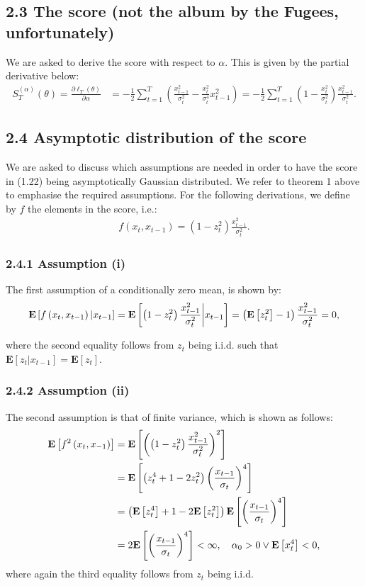 \documentclass[11pt,a4paper,oneside]{article}
\newcommand{\lp}{\left(}
\newcommand{\rp}{\right)}
\newcommand{\rb}{\right]}
\newcommand{\lb}{\left[}
\newcommand{\ee}{\mathbf{E}}
\newcommand{\sumt}{\sum_{t=1}^T}
\begin{document}
\subsection{2.3 The score (not the album by the Fugees, unfortunately)}
We are asked to derive the score with respect to $\alpha$. This is given by the partial derivative below:
\begin{align}
    S_T^{\lp \alpha\rp}\lp \theta\rp = \frac{\partial \ell_T\lp \theta\rp}{\partial \alpha} 
        &= - \frac{1}{2}\sumt \lp \frac{x_{t-1}^2}{\sigma_t^2} - \frac{x_t^2}{\sigma_t^4}x_{t-1}^2\rp = - \frac{1}{2}\sumt \lp 1 - \frac{x_t^2}{\sigma_t^2}\rp \frac{x_{t-1}^2}{\sigma_t^2}.
\end{align}

\subsection{2.4 Asymptotic distribution of the score}
We are asked to discuss which assumptions are needed in order to have the score in (1.22) being asymptotically Gaussian distributed. We refer to theorem 1 above to emphasise the required assumptions. For the following derivations, we define by $f$ the elements in the score, i.e.:
\begin{align}
    f\lp x_t, x_{t-1}\rp = \lp 1 - z_t^2\rp \frac{x_{t-1}^2}{\sigma_t^2}.
\end{align}

\subsubsection{2.4.1 Assumption (i)}
The first assumption of a conditionally zero mean, is shown by:
\begin{align}
    \ee\lb f\lp x_t, x_{t-1}\rp \vert x_{t-1}\rb 
        = \ee\lb \lp 1 - z_t^2\rp \frac{x_{t-1}^2}{\sigma_t^2}\bigg \vert x_{t-1}\rb \notag 
        = \lp \ee\lb z_t^2 \rb - 1\rp \frac{x_{t-1}^2}{\sigma_t^2} 
        = 0,
\end{align}

where the second equality follows from $z_t$ being i.i.d. such that $\ee\lb z_t \vert x_{t-1} \rb = \ee\lb z_t\rb$.

\subsubsection{2.4.2 Assumption (ii)}
The second assumption is that of finite variance, which is shown as follows:
\begin{align}
    \ee\lb f^2\lp x_t, x_{-1}\rp \rb
        &= \ee\lb \lp \lp 1 - z_t^2\rp \frac{x_{t-1}^2}{\sigma_t^2}\rp^2 \rb \notag\\
        &= \ee\lb \lp z_t^4 + 1 - 2 z_t^2\rp \lp \frac{x_{t-1}}{\sigma_t}\rp^4\rb \notag \\
        &= \lp \ee\lb z_t^4\rb + 1 - 2\ee\lb z_t^2\rb \rp \ee\lb \lp \frac{x_{t-1}}{\sigma_t}\rp^4\rb \notag \\
        &= 2 \ee\lb \lp \frac{x_{t-1}}{\sigma_t}\rp^4\rb < \infty, \quad \alpha_0 > 0 \vee \ee\lb x_t^4\rb < 0,
\end{align}
where again the third equality follows from $z_t$ being i.i.d.
\end{document}
